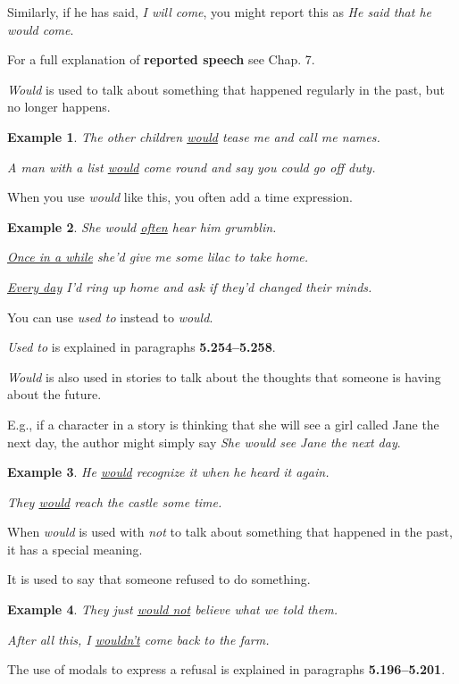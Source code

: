 \documentclass[oneside]{book}
\numberwithin{equation}{section}
\newtheorem{example}{Example}[section]
\begin{document}
Similarly, if he has said, \textit{I will come}, you might report this as \textit{He said that he would come}.

%
For a full explanation of \textbf{reported speech} see Chap. 7.

%
\noindent{} \textit{Would} is used to talk about something that happened regularly in the past, but no longer happens.
\begin{example}
    The other children \underline{would} tease me and call me names.
    
    A man with a list \underline{would} come round and say you could go off duty.
\end{example}
When you use \textit{would} like this, you often add a time expression.
\begin{example}
    She would \underline{often} hear him grumblin.
    
    \underline{Once in a while} she'd give me some lilac to take home.
    
    \underline{Every day} I'd ring up home and ask if they'd changed their minds.
\end{example}
You can use \textit{used to} instead to \textit{would}.

\textit{Used to} is explained in paragraphs \textbf{5.254--5.258}.

%
\noindent{} \textit{Would} is also used in stories to talk about the thoughts that someone is having about the future.

E.g., if a character in a story is thinking that she will see a girl called Jane the next day, the author might simply say \textit{She would see Jane the next day}.
\begin{example}
    He \underline{would} recognize it when he heard it again.
    
    They \underline{would} reach the castle some time.
\end{example}
%
\noindent{} When \textit{would} is used with \textit{not} to talk about something that happened in the past, it has a special meaning.

It is used to say that someone refused to do something.
\begin{example}
    They just \underline{would not} believe what we told them.
    
    After all this, I \underline{wouldn't} come back to the farm.
\end{example}
The use of modals to express a refusal is explained in paragraphs \textbf{5.196--5.201}.
\end{document}
